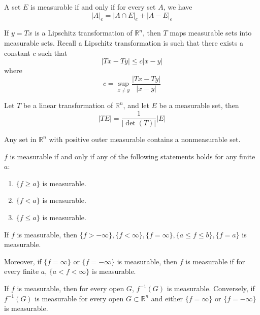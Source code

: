 \documentclass[openany]{book}
\newcommand{\R}{\mathbb{R}}
\begin{document}
\begin{thm}[Caratheodory]
    A set $E$ is measurable if and only if for every set $A$, we have 
    \begin{equation*}
        |A|_e=|A\cap E|_e+|A-E|_e
    \end{equation*}
\end{thm}
\begin{thm}
    If $y=Tx$ is a Lipschitz transformation of $\R^n$, then $T$ maps measurable sets into measurable sets. Recall a Lipschitz transformation is such that there exists a constant $c$ such that 
    \begin{equation*}
        |Tx-Ty|\leq c|x-y|
    \end{equation*}
    where 
    \begin{equation*}
        c=\sup_{x\neq y}\frac{|Tx-Ty|}{|x-y|}
    \end{equation*}
\end{thm}
\begin{thm}
    Let $T$ be a linear transformation of $\R^n$, and let $E$ be a measurable set, then 
    \begin{equation*}
        |TE|=\frac{1}{|\det(T)|}|E|
    \end{equation*}
\end{thm}
\begin{prop}
    Any set in $\R^n$ with positive outer measurable contains a nonmeasurable set.
\end{prop}
\begin{prop}   
    $f$ is measurable if and only if any of the  following statements holds for any finite $a$:
    \begin{enumerate}
        \item $\{f\geq a\}$ is measurable.
        \item $\{f<a\}$ is measurable.
        \item $\{f\leq a\}$ is measurable.
    \end{enumerate}
\end{prop}
\begin{prop}
    If $f$ is measurable, then $\{f>-\infty\},\{f<\infty\}, \{f=\infty\},\{a\leq f\leq b\}, \{f=a\}$ is measurable.

    Moreover, if $\{f=\infty\}$ or $\{f=-\infty\}$ is measurable, then $f$ is measurable if for every finite $a$, $\{a<f<\infty\}$ is measurable.
\end{prop}
\begin{thm}
    If $f$ is measurable, then for every open $G$, $f^{-1}(G)$ is measurable. Conversely, if $f^{-1}(G)$ is measurable for every open $G\subset\R^n$ and either $\{f=\infty\}$ or $\{f=-\infty\}$ is measurable.
\end{thm}
\end{document}
